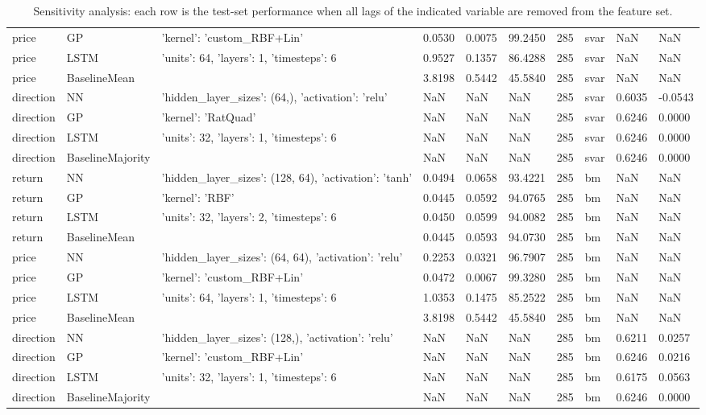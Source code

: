 \begin{table}[H]
\begin{tabular}{llllllllll}
price & GP & {'kernel': 'custom_RBF+Lin'} & 0.0530 & 0.0075 & 99.2450 & 285 & svar & NaN & NaN \\
price & LSTM & {'units': 64, 'layers': 1, 'timesteps': 6} & 0.9527 & 0.1357 & 86.4288 & 285 & svar & NaN & NaN \\
price & BaselineMean & {} & 3.8198 & 0.5442 & 45.5840 & 285 & svar & NaN & NaN \\
direction & NN & {'hidden_layer_sizes': (64,), 'activation': 'relu'} & NaN & NaN & NaN & 285 & svar & 0.6035 & -0.0543 \\
direction & GP & {'kernel': 'RatQuad'} & NaN & NaN & NaN & 285 & svar & 0.6246 & 0.0000 \\
direction & LSTM & {'units': 32, 'layers': 1, 'timesteps': 6} & NaN & NaN & NaN & 285 & svar & 0.6246 & 0.0000 \\
direction & BaselineMajority & {} & NaN & NaN & NaN & 285 & svar & 0.6246 & 0.0000 \\
return & NN & {'hidden_layer_sizes': (128, 64), 'activation': 'tanh'} & 0.0494 & 0.0658 & 93.4221 & 285 & bm & NaN & NaN \\
return & GP & {'kernel': 'RBF'} & 0.0445 & 0.0592 & 94.0765 & 285 & bm & NaN & NaN \\
return & LSTM & {'units': 32, 'layers': 2, 'timesteps': 6} & 0.0450 & 0.0599 & 94.0082 & 285 & bm & NaN & NaN \\
return & BaselineMean & {} & 0.0445 & 0.0593 & 94.0730 & 285 & bm & NaN & NaN \\
price & NN & {'hidden_layer_sizes': (64, 64), 'activation': 'relu'} & 0.2253 & 0.0321 & 96.7907 & 285 & bm & NaN & NaN \\
price & GP & {'kernel': 'custom_RBF+Lin'} & 0.0472 & 0.0067 & 99.3280 & 285 & bm & NaN & NaN \\
price & LSTM & {'units': 64, 'layers': 1, 'timesteps': 6} & 1.0353 & 0.1475 & 85.2522 & 285 & bm & NaN & NaN \\
price & BaselineMean & {} & 3.8198 & 0.5442 & 45.5840 & 285 & bm & NaN & NaN \\
direction & NN & {'hidden_layer_sizes': (128,), 'activation': 'relu'} & NaN & NaN & NaN & 285 & bm & 0.6211 & 0.0257 \\
direction & GP & {'kernel': 'custom_RBF+Lin'} & NaN & NaN & NaN & 285 & bm & 0.6246 & 0.0216 \\
direction & LSTM & {'units': 32, 'layers': 1, 'timesteps': 6} & NaN & NaN & NaN & 285 & bm & 0.6175 & 0.0563 \\
direction & BaselineMajority & {} & NaN & NaN & NaN & 285 & bm & 0.6246 & 0.0000 \\
\bottomrule
\end{tabular}
\caption{Sensitivity analysis: each row is the test-set performance when all lags of the indicated variable are removed from the feature set.}
\label{tab:ex2_sensitivity}
\end{table}
